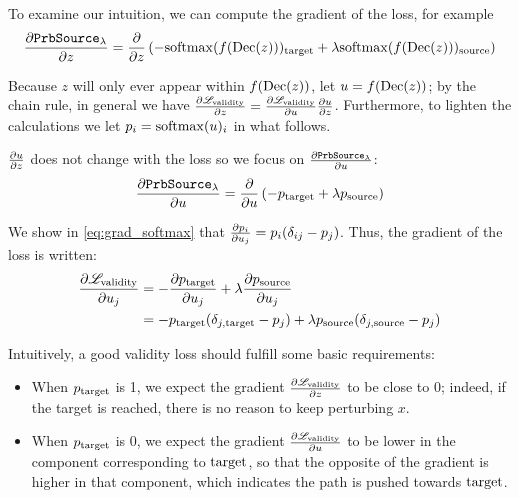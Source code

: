 \documentclass[../main.tex]{subfiles}
\begin{document}
To examine our intuition, we can compute the gradient of the loss, for example
\begin{align*}
\frac{\partial \mathtt{PrbSource}_{\lambda}}{\partial z}
=  \frac{\partial }{\partial z} \left( - \mathrm{softmax}(f(\operatorname{Dec}(z)))_{\mathrm{target}} + \lambda \mathrm{softmax}(f(\operatorname{Dec}(z)))_{\mathrm{source}} \right)
\end{align*}

Because $z$ will only ever appear within $f(\operatorname{Dec}(z))$, let $u = f(\operatorname{Dec}(z))$; by the chain rule, in general we have $\frac{\partial \mathscr{L}_\text{validity}}{\partial z} = \frac{\partial \mathscr{L}_\text{validity}}{\partial u} \frac{\partial u}{\partial z}$.
Furthermore, to lighten the calculations we let $p_i = \mathrm{softmax}(u)_i$ in what follows.

$\frac{\partial u}{\partial z}$ does not change with the loss so we focus on $\frac{\partial \mathtt{PrbSource}_{\lambda}}{\partial u}$:
\begin{align*}
\frac{\partial \mathtt{PrbSource}_{\lambda}}{\partial u}
=  \frac{\partial }{\partial u} \left( - p_{\mathrm{target}} + \lambda p_{\mathrm{source}} \right)
\end{align*}

We show in \autoref{eq:grad_softmax} that $\frac{\partial p_i}{\partial u_j} = p_i ( \delta_{ij}  -  p_j)$.
Thus, the gradient of the loss is written:
\begin{align*}
    \frac{\partial \mathscr{L}_\text{validity}}{\partial u_j}
=  - & \frac{\partial p_{\mathrm{target}} }{\partial u_j} + \lambda \frac{\partial p_{\mathrm{source}}}{\partial u_j}  \\
=  - & p_{\mathrm{target}} (\delta_{j, \mathrm{target}} - p_j) + \lambda p_{\mathrm{source}} (\delta_{j, \mathrm{source}} - p_j)
\end{align*}

Intuitively, a good validity loss should fulfill some basic requirements:
\begin{itemize}
\item When $p_{\mathrm{target}}$ is 1, we expect the gradient $\frac{\partial \mathscr{L}_\text{validity}}{\partial z}$ to be close to 0; indeed, if the target is reached, there is no reason to keep perturbing $x$.
\item When $p_{\mathrm{target}}$ is 0, we expect the gradient $\frac{\partial \mathscr{L}_\text{validity}}{\partial u}$ to be lower in the component corresponding to $\mathrm{target}$, so that the opposite of the gradient is higher in that component, which indicates the path is pushed towards $\mathrm{target}$.
\end{itemize}
\end{document}
